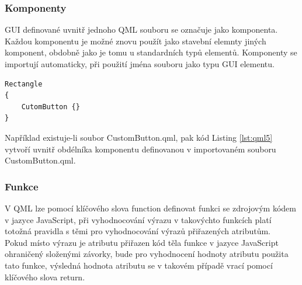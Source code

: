 \documentclass[report,11pt]{elsarticle}
\begin{document}
\subsubsection{Komponenty}
GUI definované uvnitř jednoho QML souboru se označuje jako komponenta. Každou komponentu je možné znovu použít jako stavební elemnty jiných komponent, obdobně jako je tomu u standardních typů elementů. Komponenty se importují automaticky, při použití jména souboru jako typu GUI elementu.

\begin{lstlisting}[frame=single,caption=Ukázka použití komponenty z jiného souboru.,label=lst:qml5]
Rectangle
{
	CutomButton {}
}
\end{lstlisting}
Například existuje-li soubor CustomButton.qml, pak kód Listing \ref{lst:qml5} vytvoří uvnitř obdélníka komponentu definovanou v importovaném souboru CustomButton.qml.

\subsubsection{Funkce}

V QML lze pomocí klíčového slova function definovat funkci se zdrojovým kódem v jazyce JavaScript, při vyhodnocování výrazu v takovýchto funkcích platí totožná pravidla s těmi pro vyhodnocování výrazů přiřazených atributům.\\
Pokud místo výrazu je atributu přiřazen kód těla funkce v jazyce JavaScript ohraničený složenými závorky, bude pro vyhodnocení hodnoty atributu použita tato funkce, výsledná hodnota atributu se v takovém případě vrací pomocí klíčového slova return.
\end{document}
